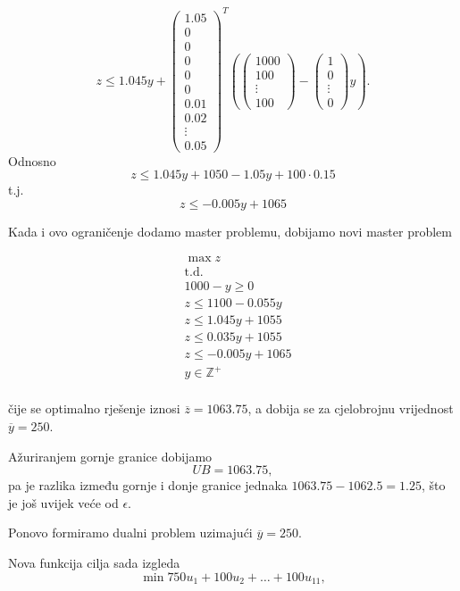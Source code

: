 \documentclass[a4paper, utf8, 11pt, colorlinks]{book}
\theoremstyle{definition}
\begin{document}
 
 $$z\leqslant 1.045y+\left(\begin{array}{c}
 	1.05\\
 0\\
 0\\
 0\\
 0\\
 0\\
 0.01 \\
 0.02 \\
 \vdots \\
 0.05
 \end{array}\right)^T
 \left(\left(\begin{array}{c}
 	1000 \\
 	100 \\
 	\vdots \\
 	100
 \end{array}\right)-\left(\begin{array}{c}
 	1 \\
 	0 \\
 	\vdots \\
 	0
 \end{array}\right)y\right).$$
 Odnosno 
 $$z\leqslant 1.045y+1050-1.05y+100\cdot0.15$$
 t.j.
 $$z\leqslant -0.005y+1065$$
 
 
 Kada i ovo ograničenje dodamo master problemu, dobijamo novi master problem
 
 $$
 \begin{aligned}
 	&\max z\\
 	&\mbox{t.d.}\\
 	&1000-y\geqslant 0\\
 	&z\leqslant 1100-0.055y\\ 
 	&z\leqslant 1.045y+1055\\
 	&z\leqslant 0.035y+1055\\
 	&z\leqslant -0.005y+1065\\
 	&y\in\mathbb{Z}^+\\	
 \end{aligned}
 $$
 

 
 čije se optimalno rješenje iznosi $\overline{z} = 1063.75$, a dobija se za cjelobrojnu vrijednost $\overline{y}=250$.
 
 Ažuriranjem gornje granice dobijamo 
 $$UB = 1063.75,$$ 
 pa je razlika između gornje i donje granice jednaka
 $1063.75-1062.5=1.25$, što je još uvijek veće od $\epsilon$.
 
Ponovo formiramo dualni problem uzimajući $\overline{y}=250$.
 
 Nova funkcija cilja sada izgleda
 $$\min 750u_1+ 100u_2+\ldots+100u_{11},$$
 
\end{document}
